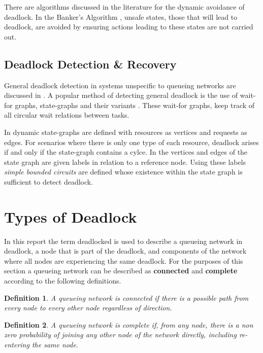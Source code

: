 \documentclass{article}
\newtheorem{definition}{Definition}
\begin{document}
There are algorithms discussed in the literature for the dynamic avoidance of deadlock.
In the Banker's Algorithm \cite{dijkstra82, kawadkaretal14}, unsafe states, those that will lead to deadlock, are avoided by ensuring actions leading to these states are not carried out.

\subsection{Deadlock Detection \& Recovery}

General deadlock detection in systems unspecific to queueing networks are discussed in \cite{coffmanelphick71}.
A popular method of detecting general deadlock is the use of wait-for graphs, state-graphs and their variants \cite{cheng90, elmagarmid86, coffmanelphick71, choetal95}.
These wait-for graphs, keep track of all circular wait relations between tasks.

In \cite{coffmanelphick71} dynamic state-graphs are defined with resources as vertices and requests as edges.
For scenarios where there is only one type of each resource, deadlock arises if and only if the state-graph contains a cylce.
In \cite{choetal95} the vertices and edges of the state graph are given labels in relation to a reference node.
Using these labels \textit{simple bounded circuits} are defined whose existence within the state graph is sufficient to detect deadlock.

\section{Types of Deadlock}\label{sec:typesofdeadlock}

In this report the term deadlocked is used to describe a queueing network in deadlock, a node that is part of the deadlock, and components of the network where all nodes are experiencing the same deadlock.
For the purposes of this section a queueing network can be described as \textbf{connected} and \textbf{complete} according to the following definitions.\\

\begin{definition}
A queueing network is connected if there is a possible path from every node to every other node regardless of direction.\\
\end{definition}

\begin{definition}
A queueing network is complete if, from any node, there is a non zero probability of joining any other node of the network directly, including re-entering the same node.\\
\end{definition}
\end{document}
